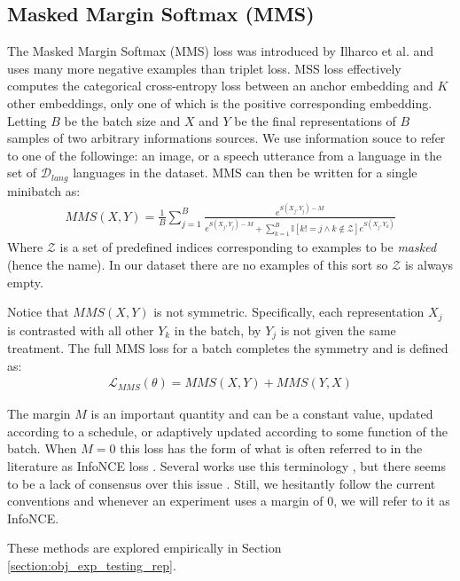\subsection{Masked Margin Softmax (MMS)}
\label{section:mms_loss}
The Masked Margin Softmax (MMS) loss was introduced by Ilharco et al. \cite{ilharco2019large} and uses many more negative examples than triplet loss.
MSS loss effectively computes the categorical cross-entropy loss between an anchor embedding and $K$ other embeddings, only one of which is the positive corresponding embedding.
Letting $B$ be the batch size and $X$ and $Y$ be the final representations of $B$ samples of two arbitrary informations sources.
We use information souce to refer to one of the followinge: an image, or a speech utterance from a language in the set of $\mathcal{D}_{lang}$ languages in the dataset. 
MMS can then be written for a single minibatch as:
\begin{align}
    \label{MMS_base}
    MMS(X,Y) = \frac{1}{B}\sum_{j=1}^B\frac{e^{S(X_j, Y_j)-M}}{e^{S(X_j, Y_j)-M} +\sum_{k=1}^{B} \mathbb{I}[k!=j \land k \notin \mathcal{Z}]e^{S(X_j, Y_k)}}
\end{align}
Where $\mathcal{Z}$ is a set of predefined indices corresponding to examples to be \textit{masked} (hence the name).
In our dataset there are no examples of this sort so $\mathcal{Z}$ is always empty.

Notice that $MMS(X, Y)$ is not symmetric. 
Specifically, each representation $X_j$ is contrasted with all other $Y_k$ in the batch, by $Y_j$ is not given the same treatment.
The full MMS loss for a batch completes the symmetry and is defined as:
\begin{align}
    \label{eq:mms}
    \mathcal{L}_{MMS}(\theta) = MMS(X,Y) + MMS(Y,X)
\end{align}

The margin $M$ is an important quantity and can be a constant value, updated according to a schedule, or adaptively updated according to some function of the batch.
When $M=0$ this loss has the form of what is often referred to in the literature as InfoNCE loss \cite{oord2018representation}.
Several works use this terminology \cite{he2020momentum, hjelm2018learning}, but there seems to be a lack of consensus over this issue \cite{tian2020contrastive}.
Still, we hesitantly follow the current conventions and whenever an experiment uses a margin of 0, we will refer to it as InfoNCE.

These methods are explored empirically in Section \ref{section:obj_exp_testing_rep}.

